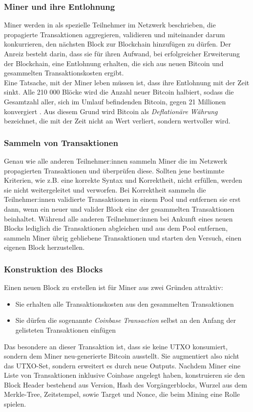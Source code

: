 \subsubsection{Miner und ihre Entlohnung}
Miner werden in \cite{khairuddin_sas_2019} als spezielle Teilnehmer im Netzwerk beschrieben, die propagierte Transaktionen aggregieren, validieren und miteinander darum konkurrieren, den nächsten Block zur Blockchain hinzufügen zu dürfen. 
Der Anreiz besteht darin, dass sie für ihren Aufwand, bei erfolgreicher Erweiterung der Blockchain, eine Entlohnung erhalten, die sich aus neuen Bitcoin und gesammelten Transaktionskosten ergibt.\\
Eine Tatsache, mit der Miner leben müssen ist, dass ihre Entlohnung mit der Zeit sinkt. 
Alle 210 000 Blöcke wird die Anzahl neuer Bitcoin halbiert, sodass die Gesamtzahl aller, sich im Umlauf befindenden Bitcoin, gegen 21 Millionen konvergiert \cite[]{goorha_2019}. 
Aus diesem Grund wird Bitcoin als \emph{Deflationäre Währung} bezeichnet, die mit der Zeit nicht an Wert verliert, sondern wertvoller wird.
\subsubsection{Sammeln von Transaktionen}
Genau wie alle anderen Teilnehmer:innen sammeln Miner die im Netzwerk propagierten Transaktionen und überprüfen diese. Sollten jene bestimmte Kriterien, wie z.B. eine korrekte Syntax und Korrektheit, nicht erfüllen, werden sie nicht weitergeleitet und verworfen.
Bei Korrektheit sammeln die Teilnehmer:innen validierte Transaktionen in einem Pool und entfernen sie erst dann, wenn ein neuer und valider Block eine der gesammelten Transaktionen beinhaltet. 
Während alle anderen Teilnehmer:innen bei Ankunft eines neuen Blocks lediglich die Transaktionen abgleichen und aus dem Pool entfernen, sammeln Miner übrig gebliebene Transaktionen und starten den Versuch, einen eigenen Block herzustellen.
\subsubsection{Konstruktion des Blocks}
Einen neuen Block zu erstellen ist für Miner aus zwei Gründen attraktiv:
\begin{itemize}
\item Sie erhalten alle Transaktionskosten aus den gesammelten Transaktionen
\item Sie dürfen die sogenannte \emph{Coinbase Transaction} selbst an den Anfang der gelisteten Transaktionen einfügen
\end{itemize}
Das besondere an dieser Transaktion ist, dass sie keine UTXO konsumiert, sondern dem Miner neu-generierte Bitcoin ausstellt. Sie augmentiert also nicht das UTXO-Set, sondern erweitert es durch neue Outputs.
Nachdem Miner eine Liste von Transaktionen inklusive Coinbase angelegt haben, konstruieren sie den Block Header bestehend aus Version, Hash des Vorgängerblocks, Wurzel aus dem Merkle-Tree, Zeitstempel, sowie Target und Nonce, die beim Mining eine Rolle spielen.
